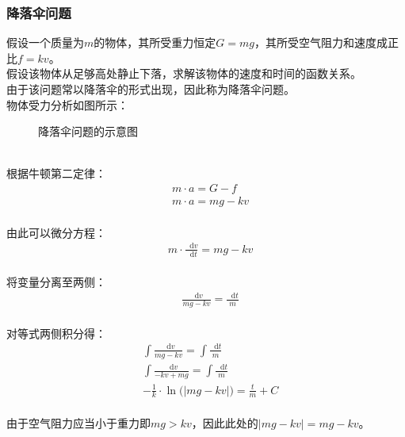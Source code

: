 \documentclass[UTF8]{ctexart}
\newcommand*{\veb}[1]{\vb*{#1}}
\newcommand*{\dif}{\mathop{}\!\mathrm{d}}
\begin{document}
\subsubsection{降落伞问题}
    \setcounter{equation}{0}
    假设一个质量为$m$的物体，其所受重力恒定$G=mg$，其所受空气阻力和速度成正比$f=kv$。\\[3mm]
    假设该物体从足够高处静止下落，求解该物体的速度和时间的函数关系。\\[3mm]
    由于该问题常以降落伞的形式出现，因此称为降落伞问题。\\[3mm]
    物体受力分析如图所示：
    \begin{figure}[h]
        \begin{center}
            \caption{降落伞问题的示意图}
        \end{center}
    \end{figure}\\
    根据牛顿第二定律：
    \begin{align}
        &m\cdot a=G-f\\[3mm]
        &m\cdot a=mg-kv
    \end{align}\\
    由此可以微分方程：
    \begin{align}
        &m\cdot\frac{\dif v}{\dif t}=mg-kv
    \end{align}\\
    将变量分离至两侧：
    \begin{align}
        &\frac{\dif v}{mg-kv}=\frac{\dif t}{m}
    \end{align}\\
    对等式两侧积分得：
    \begin{align}
        &\int\frac{\dif v}{mg-kv}=\int\frac{\dif t}{m}\\[3mm]
        &\int\frac{\dif v}{-kv+mg}=\int\frac{\dif t}{m}\\[3mm]
        &-\frac{1}{k}\cdot\ln\big(|mg-kv|\big)=\frac{t}{m}+C
    \end{align}\\
    由于空气阻力应当小于重力即$mg>kv$，因此此处的$|mg-kv|=mg-kv$。
\end{document}
